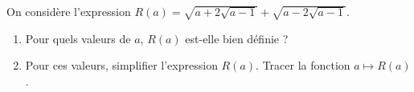 \documentclass[a4paper, 11pt]{article}
\begin{document}
\begin{correction}
\begin{enumerate}
\end{enumerate}
\end{correction}









\begin{exercice}
On consid\`ere l'expression $R(a)=\sqrt{a+2\sqrt{a-1}}+\sqrt{a-2\sqrt{a-1}}$.
\begin{enumerate}
 \item Pour quels valeurs de $a$, $R(a)$ est-elle bien d\'efinie ? 
\item Pour ces valeurs, simplifier l'expression $R(a)$. Tracer la fonction $a\mapsto R(a)$.
\end{enumerate}
\end{exercice}
\end{document}
